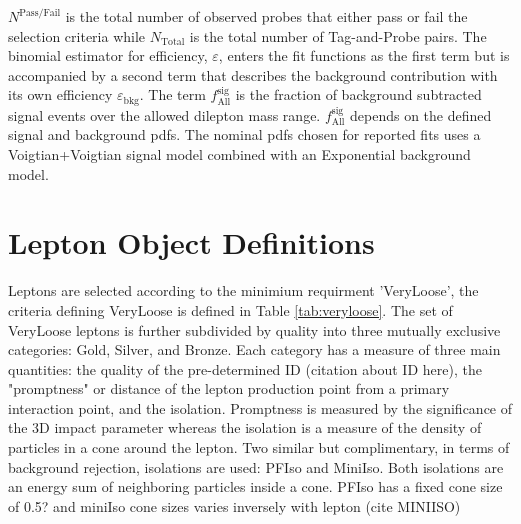 $N^{\text{Pass/Fail}}$ is the total number of observed probes that either pass or fail the selection criteria while $N_{\text{Total}}$ is the total number of Tag-and-Probe pairs.
The binomial estimator for efficiency, $\varepsilon$, enters the fit functions as the first term but is accompanied by a second term that describes the background contribution with its own efficiency $\varepsilon_{\text{bkg}}$.  The term $f^{\text{sig}}_{\text{All}}$ is the fraction of background subtracted signal events over the allowed dilepton mass range.  $f^{\text{sig}}_{\text{All}}$ depends on the defined signal and background pdfs. The nominal pdfs chosen for reported fits uses a Voigtian+Voigtian signal model combined with an Exponential background model. 





\section{Lepton Object Definitions}


Leptons are selected according to the minimium requirment 'VeryLoose', the criteria defining VeryLoose is defined in Table \ref{tab:veryloose}.  The set of VeryLoose leptons is further subdivided by quality into three mutually exclusive categories: Gold, Silver, and Bronze. Each category has a measure of three main quantities: the quality of the pre-determined ID (citation about ID here), the "promptness" or distance of the lepton production point from a primary interaction point, and the isolation. Promptness is measured by the significance of the 3D impact parameter whereas the isolation is a measure of the density of particles in a cone around the lepton. Two similar but complimentary, in terms of background rejection, isolations are used: PFIso and MiniIso. Both isolations are an energy sum of neighboring particles inside a cone. PFIso has a fixed cone size of 0.5? and miniIso cone sizes varies inversely with lepton \pt (cite MINIISO)


